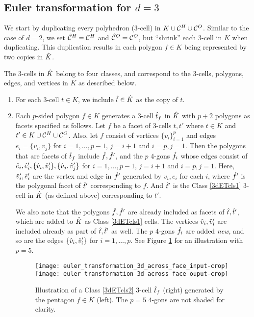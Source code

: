 \subsection{Euler transformation for $d=3$} \label{ssec:euler3d}

We start by duplicating every polyhedron ($3$-cell) in $K \cup \mathcal{C}^H \cup \mathcal{C}^O$.
Similar to the case of $d=2$, we set $\hat{\mathcal{C}}^H = \mathcal{C}^H$ and $\hat{\mathcal{C}}^O = \mathcal{C}^O$, but ``shrink'' each $3$-cell in $K$ when duplicating.
This duplication results in each polygon $f \in K$ being represented by two copies in $\hat{K}$.

The $3$-cells in $\hat{K}$ belong to four classes, and correspond to the $3$-cells, polygons, edges, and vertices in $K$ as described below.
%
\begin{enumerate}
  \item \label{3dETcls1}
    For each $3$-cell $t \in K$, we include $\hat{t} \in \hat{K}$ as the copy of $t$.
    
  \item \label{3dETcls2}
      Each $p$-sided polygon $f \in K$ generates a $3$-cell $\hat{t}_f$ in $\hat{K}$ with $p+2$ polygons as facets specified as follows.
      Let $f$ be a facet of $3$-cells $t, t'$ where $t \in K$ and $t' \in K \cup \mathcal{C}^H \cup \mathcal{C}^O$.
      Also, let $f$ consist of vertices $\{v_i\}_{i=1}^p$ and edges $e_i=\{v_i,v_j\}$ for $i=1,\dots,p-1,\,j=i+1$ and $i=p,j=1$.
      Then the polygons that are facets of $\hat{t}_f$ include $\hat{f}, \hat{f}'$, and the $p$ $4$-gons $\hat{f}_i$ whose edges consist of $\hat{e}_i,\hat{e}'_i, \{\hat{v}_i,\hat{v}_i'\}, \{\hat{v}_j, \hat{v}_j'\}$ for $i=1,\dots,p-1,\,j=i+1$ and $i=p,j=1$.
      Here, $\hat{v}'_i, \hat{e}'_i$ are the vertex and edge in $\hat{f}'$ generated by $v_i, e_i$ for each $i$, where $\hat{f}'$ is the polygonal facet of $\hat{t}'$ corresponding to $f$.
      And $\hat{t}'$ is the Class \ref{3dETcls1} $3$-cell in $\hat{K}$ (as defined above) corresponding to $t'$.

      We also note that the polygons $\hat{f},\hat{f}'$ are already included as facets of $\hat{t}, \hat{t}'$, which are added to $\hat{K}$ as Class \ref{3dETcls1} cells.
      The vertices $\hat{v}_i, \hat{v}'_i$ are included already as part of $\hat{t}, \hat{t}'$ as well.
      The $p$ $4$-gons $\hat{f}_i$ are added \emph{new}, and so are the edges $\{\hat{v}_i,\hat{v}'_i\}$ for $i=1,\dots,p$.
      See Figure \ref{fig:3dETcls2} for an illustration with $p=5$.
      \begin{figure}[htp!]
        \centering
        \texttt{[image: euler\_transformation\_3d\_across\_face\_input-crop]}
        \hspace*{0.3in}
        \texttt{[image: euler\_transformation\_3d\_across\_face\_ouput-crop]}
        \caption{Illustration of a Class \ref{3dETcls2} $3$-cell $\hat{t}_f$ (right) generated by the pentagon $f \in K$ (left).
          The $p=5$ $4$-gons are not shaded for clarity.}
        \label{fig:3dETcls2}
      \end{figure}
      

\end{enumerate}
